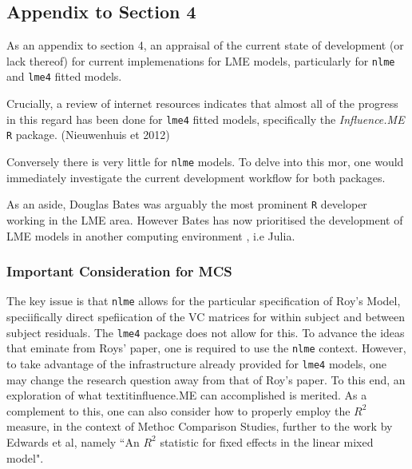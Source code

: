 \documentclass[12pt, a4paper]{report}
\theoremstyle{plain}
\theoremstyle{definition}
\theoremstyle{remark}
\begin{document}
\subsection*{Appendix to Section 4}




As an appendix to section 4, an appraisal of the current state of development (or lack thereof) for current implemenations for LME models, particularly for
\texttt{nlme} and \texttt{lme4} fitted models.

Crucially, a review of internet resources indicates that almost all of the progress in this regard has been done for \texttt{lme4} fitted models, specifically the \textit{Influence.ME} \texttt{R} package. (Nieuwenhuis et 2012)

Conversely there is very little for \texttt{nlme} models. To delve into this mor, one would immediately investigate the current development workflow for both packages.

As an aside, Douglas Bates was arguably the most prominent \texttt{R} developer working in the LME area. 
However Bates has now prioritised the development of LME models in another computing environment , i.e Julia. 


\subsubsection*{Important Consideration for MCS}

The key issue is that \texttt{nlme} allows for the particular specification of Roy's Model, speciifically direct spefiication of the VC matrices for within subject and between subject residuals.
The \texttt{lme4} package does not allow for this.
To advance the ideas that eminate from Roys' paper, one is required to use the \texttt{nlme} context. However, to take advantage of the infrastructure already provided for \texttt{lme4} models, one may change the research question away from that of Roy's paper. 
To this end, an exploration of what textit{influence.ME} can accomplished is merited.
As a complement to this, one can also consider how to properly employ the $R^2$ measure, in the context of Methoc Comparison Studies, further to the work by Edwards et al, namely ``An $R^2$ statistic for fixed effects in the linear mixed model".
\end{document}
